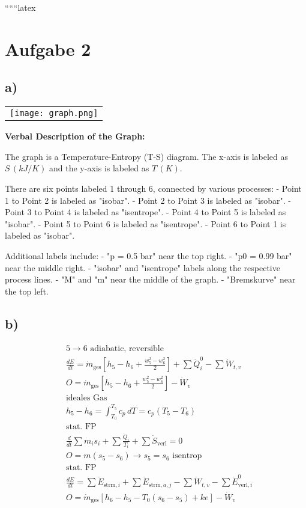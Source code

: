 
``````latex


\section*{Aufgabe 2}

\subsection*{a)}

\begin{center}
\begin{tabular}{c}
\texttt{[image: graph.png]}
\end{tabular}
\end{center}

\textbf{Verbal Description of the Graph:}

The graph is a Temperature-Entropy (T-S) diagram. The x-axis is labeled as $S \, (kJ/K)$ and the y-axis is labeled as $T \, (K)$. 

There are six points labeled 1 through 6, connected by various processes:
- Point 1 to Point 2 is labeled as "isobar".
- Point 2 to Point 3 is labeled as "isobar".
- Point 3 to Point 4 is labeled as "isentrope".
- Point 4 to Point 5 is labeled as "isobar".
- Point 5 to Point 6 is labeled as "isentrope".
- Point 6 to Point 1 is labeled as "isobar".

Additional labels include:
- "p = 0.5 bar" near the top right.
- "p0 = 0.99 bar" near the middle right.
- "isobar" and "isentrope" labels along the respective process lines.
- "M" and "m" near the middle of the graph.
- "Bremskurve" near the top left.

\subsection*{b)}

\begin{align*}
&5 \rightarrow 6 \text{ adiabatic, reversible} \\
&\frac{dE}{dt} = \dot{m}_{\text{ges}} \left[ h_5 - h_6 + \frac{w_5^2 - w_6^2}{2} \right] + \sum \dot{Q}_i^0 - \sum \dot{W}_{t,v} \\
&O = \dot{m}_{\text{ges}} \left[ h_5 - h_6 + \frac{w_5^2 - w_6^2}{2} \right] - \dot{W}_v \\
&\boxed{\text{ideales Gas}} \\
&h_5 - h_6 = \int_{T_0}^{T_5} c_p \, dT = c_p (T_5 - T_6) \\
&\text{stat. FP} \\
&\frac{d}{dt} \sum \dot{m}_i s_i + \sum \frac{\dot{Q}_i}{T_i} + \sum \dot{S}_{\text{verl}} = 0 \\
&O = m (s_5 - s_6) \rightarrow s_5 = s_6 \text{ isentrop} \\
&\text{stat. FP} \\
&\frac{dE}{dt} = \sum \dot{E}_{\text{strm},i} + \sum \dot{E}_{\text{strm},a,j} - \sum \dot{W}_{t,v} - \sum \dot{E}_{\text{verl},i}^0 \\
&O = \dot{m}_{\text{ges}} \left[ h_6 - h_5 - T_0 (s_6 - s_5) + ke \right] - \dot{W}_v
\end{align*}

